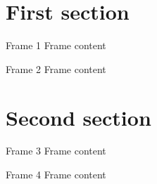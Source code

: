 \documentclass[aspectratio=43]{beamer}		%
\begin{document}
     \frame[plain]{\titlepage}
  
	\begin{frame}{\contentsname}
		\tableofcontents
	\end{frame}
  
    \section{First section}
    \begin{frame}{Frame 1}
        Frame content
    \end{frame}
    \begin{frame}{Frame 2}
        Frame content
    \end{frame}
    
    \section{Second section}
    \begin{frame}{Frame 3}
        Frame content
    \end{frame}
    \begin{frame}{Frame 4}
        Frame content
    \end{frame}
\end{document}
